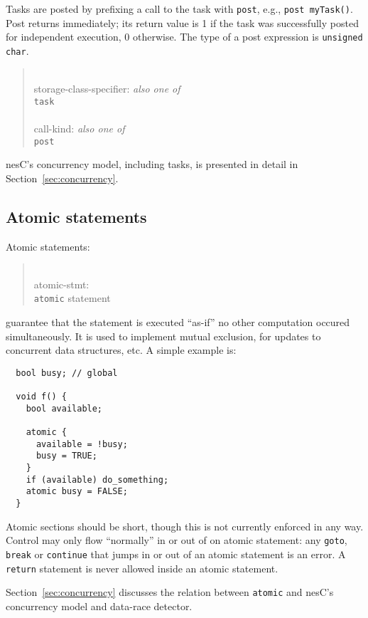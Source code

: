 \documentclass[11pt,letterpaper]{article}
\newcommand{\kw}[1]{{\tt #1}}
\newcommand{\code}[1]{{\tt #1}}
\newcommand{\nesc}{nesC\xspace}
\newcommand{\grammarshift}{\vspace*{-.7cm}}
\newcommand{\grammarindent}{\hspace*{2cm}\= \\ \kill}
\begin{document}
Tasks are posted by prefixing a call to the task with \kw{post}, e.g.,
\code{post myTask()}. Post returns immediately; its return value is 1 if
the task was successfully posted for independent execution, 0
otherwise. The type of a post expression is \code{unsigned char}.
\begin{quote} \grammarshift \em \begin{tabbing}
\grammarindent
storage-class-specifier: \emph{also one of}\\
\>	\kw{task}\\
\\
call-kind: \emph{also one of}\\
\>	\kw{post}
\end{tabbing} \end{quote}

\nesc's concurrency model, including tasks, is presented in detail in
Section~\ref{sec:concurrency}.

\subsection{Atomic statements}

Atomic statements:
\begin{quote} \grammarshift \em \begin{tabbing}
\grammarindent
atomic-stmt: \\
\>	\kw{atomic} statement\\
\end{tabbing} \end{quote}
guarantee that the statement is executed ``as-if'' no other computation
occured simultaneously. It is used to implement mutual exclusion, for
updates to concurrent data structures, etc. A simple example is:
\begin{verbatim}
  bool busy; // global

  void f() {
    bool available;

    atomic {
      available = !busy;
      busy = TRUE;
    }
    if (available) do_something;
    atomic busy = FALSE;
  }
\end{verbatim}

Atomic sections should be short, though this is not currently enforced in
any way.  Control may only flow ``normally'' in or out of on atomic
statement: any \kw{goto}, \kw{break} or \kw{continue} that jumps in or out
of an atomic statement is an error. A \kw{return} statement is never
allowed inside an atomic statement.

Section~\ref{sec:concurrency} discusses the relation between \kw{atomic} and
\nesc's concurrency model and data-race detector.
\end{document}
